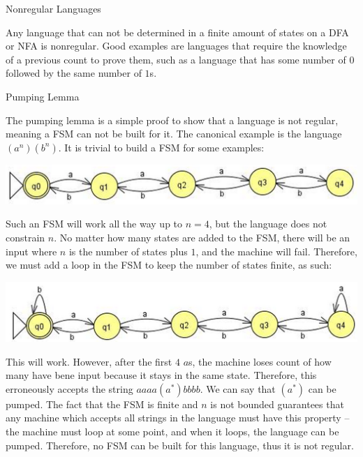 \documentclass[2pt,legalpaper]{scrartcl}
\makeatletter
\renewcommand{\section}{\@startsection{section}{1}{0mm}
  {-1ex plus -.5ex minus -.2ex}
  {0.5ex plus .2ex}
{\normalfont\large\bfseries}}
\renewcommand{\subsection}{\@startsection{subsection}{2}{0mm}
  {-1explus -.5ex minus -.2ex}
  {0.5ex plus .2ex}
{\normalfont\normalsize\bfseries}}
\makeatother
\begin{document}
\begin{multicols}{6}
  \section{Nonregular Languages}

  Any language that can not be determined in a finite amount of states on a DFA or NFA is nonregular. Good examples are languages that require the knowledge of a previous count to prove them, such as a language that has some number of $0$ followed by the same number of $1$s.

  \subsection{Pumping Lemma}

  The pumping lemma is a simple proof to show that a language is not regular, meaning a FSM can not be built for it. The canonical example is the language $(a^n)(b^n)$. It is trivial to build a FSM for some examples:

  \includegraphics[scale=0.25]{simple_pumping_fsm.png}

  Such an FSM will work all the way up to $n = 4$, but the language does not constrain $n$. No matter how many states are added to the FSM, there will be an input where $n$ is the number of states plus $1$, and the machine will fail. Therefore, we must add a loop in the FSM to keep the number of states finite, as such:

  \includegraphics[scale=0.25]{loop_pumping_fsm.png}

  This will work. However, after the first $4$ $a$s, the machine loses count of how many have bene input because it stays in the same state. Therefore, this erroneously accepts the string $aaaa(a^*)bbbb$. We can say that $(a^*)$ can be pumped. The fact that the FSM is finite and $n$ is not bounded guarantees that any machine which accepts all strings in the language must have this property -- the machine must loop at some point, and when it loops, the language can be pumped. Therefore, no FSM can be built for this language, thus it is not regular.


\end{multicols}
\end{document}
